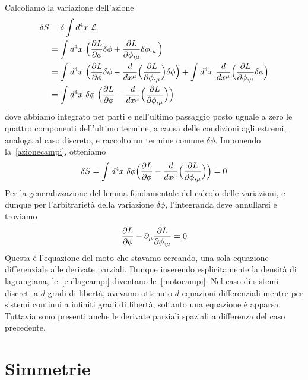     Calcoliamo la variazione dell'azione
    \begin{equation*}
    \begin{aligned}
        \delta S & = \delta \int d^4 x ~ \mathcal L \\ & = \int d^4 x ~ \Big (\frac{\partial L}{\partial\phi} \delta \phi + \frac{\partial L}{\partial\phi,_\mu} \delta \phi,_\mu \Big) \\ & = \int d^4 x ~ \Big (\frac{\partial L}{\partial\phi} \delta \phi - \frac{d}{dx^\mu} \Big (\frac{\partial L}{\partial\phi,_\mu} \Big) \delta \phi \Big) + \int d^4 x ~ \frac{d}{dx^\mu} \Big ( \frac{\partial L}{\partial\phi,_\mu} \delta \phi \Big ) \\ & = \int d^4 x ~ \delta \phi ~ \Big (\frac{\partial L}{\partial\phi} - \frac{d}{dx^\mu} \Big (\frac{\partial L}{\partial\phi,_\mu} \Big) \Big)
    \end{aligned}
    \end{equation*}
    dove abbiamo integrato per parti e nell'ultimo passaggio posto uguale a zero le quattro componenti dell'ultimo termine, a causa delle condizioni agli estremi, analoga al caso discreto, e raccolto un termine comune $\delta \phi$. Imponendo la~\eqref{azionecampi}, otteniamo
    \begin{equation*}
        \delta S = \int d^4 x ~ \delta \phi \Big (\frac{\partial L}{\partial\phi} - \frac{d}{dx^\mu} \Big (\frac{\partial L}{\partial\phi,_\mu} \Big) \Big)  = 0
    \end{equation*}
    Per la generalizzazione del lemma fondamentale del calcolo delle variazioni, e dunque per l'arbitrarietà della variazione $\delta \phi$, l'integranda deve annullarsi e troviamo
    \begin{equation} \label{eullagcampi}
        \frac{\partial L}{\partial\phi} - \partial_\mu \frac{\partial L}{\partial\phi,_\mu} = 0
    \end{equation}
    Questa è l'equazione del moto che stavamo cercando, una sola equazione differenziale alle derivate parziali. Dunque inserendo esplicitamente la densità di lagrangiana, le~\eqref{eullagcampi} diventano le~\eqref{motocampi}. Nel caso di sistemi discreti a $d$ gradi di libertà, avevamo ottenuto $d$ equazioni differenziali mentre per sistemi continui a infiniti gradi di libertà, soltanto una equazione è apparsa. Tuttavia sono presenti anche le derivate parziali spaziali a differenza del caso precedente. 

\section{Simmetrie}
    
